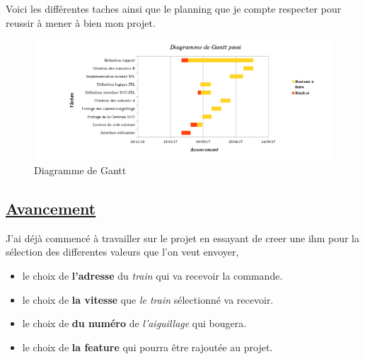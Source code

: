   Voici les différentes taches ainsi que le planning que je compte
respecter pour reussir à mener à bien mon projet.


\begin{figure}[ht]
\centering
\includegraphics[scale=0.5]{gantt.png}
\caption{Diagramme de Gantt}
\label{fig6}
\end{figure}

\subsection{\underline{ Avancement}}
\label{sec:avanc}

J'ai d\'ej\`a commenc\'e \`a travailler sur le projet en essayant de
creer une ihm pour la s\'election des differentes valeurs que l'on
veut envoyer, 
  \begin{itemize}
    \item le choix de \textbf{l'adresse} du \emph{train} qui va recevoir la commande.
    \item le choix de \textbf{la vitesse} que \emph{le train} s\'electionn\'e
      va recevoir.
    \item le choix de \textbf{du numéro} de \emph{l'aiguillage} qui bougera.
    \item le choix de \textbf{la feature} qui pourra \^etre rajout\'ee
      au projet.
  \end{itemize}

